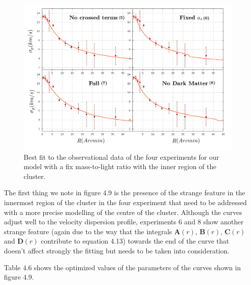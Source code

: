 \begin{figure}[H]
\centering
\includegraphics[width=15cm]{images/fix_gamma_refinado_12.png}
\caption[Best fit of our model with a fix mass-to-light ratio with the inner region]{Best fit to the observational data of the four experiments for our model with a fix mass-to-light ratio with the inner region of the cluster.}
\end{figure}

The first thing we note in figure 4.9 is the presence of the strange feature in the innermost region of the cluster in the four experiment that need to be addressed with a more precise modelling of the centre of the cluster. Although the curves adjust well to the velocity dispersion profile, experiments 6 and 8 show another strange feature (again due to the way that the integrals $\mathbf{A}(r)$, $\mathbf{B}(r)$, $\mathbf{C}(r)$ and $\mathbf{D}(r)$ contribute to equation 4.13) towards the end of the curve that doesn't affect strongly the fitting but needs to be taken into consideration.

Table 4.6 shows the optimized values of the parameters of the curves shown in figure 4.9.

